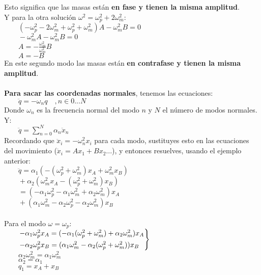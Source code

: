 \documentclass[a4paper,landscape,10pt]{cheatsheet}
\begin{document}
Esto significa que las masas están \textbf{en fase y tienen la misma amplitud}.\\
Y para la otra solución $\omega^2=\omega_p^2+2\omega_m^2$:\\
$\qquad (-\omega_p^2-2\omega_m^2+\omega_p^2+\omega_m^2)A-\omega_m^2B=0$\\
$\qquad -\omega_m^2A-\omega_m^2B=0$\\
$\qquad A=-\frac{\omega_m^2}{\omega_m^2}B$\\
$\qquad A=-B$\\
En este segundo modo las masas están \textbf{en contrafase y tienen la misma amplitud}.\\
\hfill\\
\textbf{Para sacar las coordenadas normales}, tenemos las ecuaciones:\\
$\qquad \ddot{q}=-\omega_n q\quad,n\in{0...N}$\\
Donde $\omega_n$ es la frecuencia normal del modo $n$ y $N$ el número de modos normales. Y:\\
$\qquad \ddot{q}=\sum_{n=0}^{N}\alpha_n\ddot{x}_n$\\
Recordando que $\ddot{x}_i=-\omega_n^2x_i$ para cada modo, sustituyes esto en las ecuaciones del
movimiento ($\ddot{x}_i=Ax_1+Bx_2...$), y entonces resuelves, usando el ejemplo anterior:\\
$\qquad \ddot{q}=\alpha_1(-(\omega_p^2+\omega_m^2)x_A+\omega_m^2x_B)$\\
$\qquad +\alpha_2(\omega_m^2x_A-(\omega_p^2+\omega_m^2)x_B)$\\
$\qquad =(-\alpha_1\omega_p^2-\alpha_1\omega_m^2+\alpha_2\omega_m^2)x_A$\\
$\qquad +(\alpha_1\omega_m^2-\alpha_2\omega_p^2-\alpha_2\omega_m^2)x_B$\\
\hfill\\
Para el modo $\omega=\omega_p$:\\
$\qquad \begin{rcases}
    -\alpha_1\omega_p^2x_A=(-\alpha_1(\omega_p^2+\omega_m^2)+\alpha_2\omega_m^2)x_A \\
    -\alpha_2\omega_p^2x_B=(\alpha_1\omega_m^2-\alpha_2(\omega_p^2+\omega_m^2))x_B  \\
  \end{rcases}
$\\
$\qquad \alpha_2\omega_m^2=\alpha_1\omega_m^2$\\
$\qquad \alpha_2=\alpha_1$\\
$\qquad q_1=x_A+x_B$\\
\hfill\\
\end{document}
